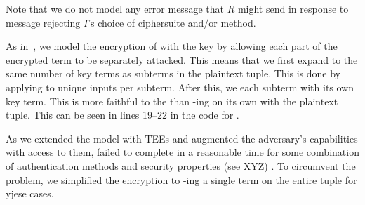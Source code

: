 Note that we do not model any error message that $R$ might send in response
to message \mMsgone rejecting $I$'s choice of ciphersuite and/or method.
%

As in~\cite{Norr21}, we model the \mXor{} encryption of  with
the key  by allowing each part of the encrypted term to be
separately attacked.
%
This means that we first expand  to the same number of key terms as
subterms in the plaintext tuple.
%
This is done by applying \mHkdfExpand{} to unique inputs per subterm.
%
After this, we \mXor{} each subterm with its own key term.
%
This is more faithful to the \mSpec{} than \mXor-ing  on its own
with the plaintext tuple.
%
This can be seen in lines 19--22 in the code for .
%

As we extended the model with TEEs and augmented the adversary's capabilities
with access to them, \mTamarin{} failed to complete in a reasonable time for
some combination of authentication methods and security properties (see XYZ)
.
%
To circumvent the problem, we simplified the \mXor{} encryption to \mXor-ing a
single term on the entire tuple for yjese cases.
%

